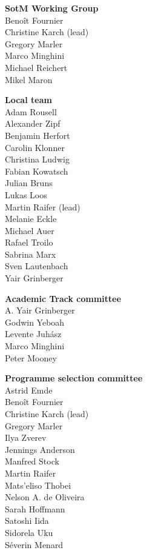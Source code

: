 \newlength{\volunteerSpace}
\setlength{}
\RaggedRight
\begin{multicols}{2}
  \begin{small}
    \textbf{SotM Working Group}\\
    Benoît Fournier\\
    Christine Karch (lead)\\
    Gregory Marler\\
    Marco Minghini\\
    Michael Reichert\\
    Mikel Maron

    \vspace{\volunteerSpace}
    \textbf{Local team}\\
    Adam Rousell\\
    Alexander Zipf\\
    Benjamin Herfort\\
    Carolin Klonner\\
    Christina Ludwig\\
    Fabian Kowatsch\\
    Julian Bruns\\
    Lukas Loos\\
    Martin Raifer (lead)\\
    Melanie Eckle\\
    Michael Auer\\
    Rafael Troilo\\
    Sabrina Marx\\
    Sven Lautenbach\\
    Yair Grinberger

    \enlargethispage{1\baselineskip}

    \vspace{\volunteerSpace}
    \textbf{Academic Track committee}\\
    A. Yair Grinberger\\
    Godwin Yeboah\\
    Levente Juhász\\
    Marco Minghini\\
    Peter Mooney

    \vspace{\volunteerSpace}
    \textbf{Programme selection \mbox{committee}}\\
    Astrid Emde\\
    Benoît Fournier\\
    Christine Karch (lead)\\
    Gregory Marler\\
    Ilya Zverev\\
    Jennings Anderson\\
    Manfred Stock\\
    Martin Raifer\\
    Mats'eliso Thobei\\
    Nelson A. de Oliveira\\
    Sarah Hoffmann\\
    Satoshi Iida\\
    Sidorela Uku\\
    Séverin Menard


\end{small}
\end{multicols}
